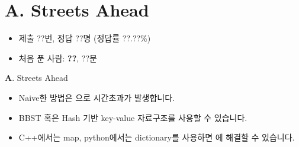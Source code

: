 \section{A. Streets Ahead}

\begin{frame} %
    \begin{itemize}
        \item 제출 ??번, 정답 ??명 (정답률 ??.??\%)
        \item 처음 푼 사람: \textbf{??}, ??분
    \end{itemize}
\end{frame}

\begin{frame}{\textbf{A}. Streets Ahead}
    \begin{itemize}
        \item Naive한 방법은 으로 시간초과가 발생합니다.
        \item BBST 혹은 Hash 기반 key-value 자료구조를 사용할 수 있습니다.
        \item C++에서는 map, python에서는 dictionary를 사용하면 에 해결할 수 있습니다. 
    \end{itemize}
\end{frame}